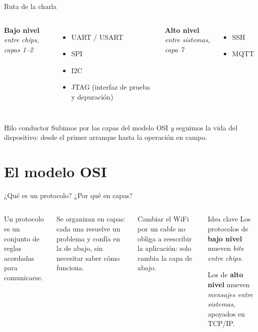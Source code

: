 \documentclass[aspectratio=169,11pt]{beamer}
\begin{document}
\begin{frame}{Ruta de la charla}
\begin{columns}[T]
\textbf{\color{cobre}Bajo nivel} \\ \emph{entre chips, capas 1--2}
\begin{itemize}
  \item UART / USART
  \item SPI
  \item I2C
  \item JTAG (interfaz de prueba y depuración)
\end{itemize}
\textbf{\color{acero}Alto nivel} \\ \emph{entre sistemas, capa 7}
\begin{itemize}
  \item SSH
  \item MQTT
\end{itemize}
\end{columns}

\vspace{1em}
\begin{alertblock}{Hilo conductor}
Subimos por las capas del modelo OSI \emph{y} seguimos la vida del dispositivo: desde el primer arranque hasta la operación en campo.
\end{alertblock}
\end{frame}

\section{El modelo OSI}

\begin{frame}{¿Qué es un protocolo? ¿Por qué en capas?}
\begin{columns}[T]
Un \alert{protocolo} es un conjunto de reglas acordadas para comunicarse.

\vspace{0.5em}
Se organizan en \alert{capas}: cada una resuelve un problema y confía en la de abajo, sin necesitar saber cómo funciona.

\vspace{0.5em}
{\footnotesize Cambiar el WiFi por un cable no obliga a reescribir la aplicación: solo cambia la capa de abajo.}

\begin{block}{Idea clave}
Los protocolos de \textbf{bajo nivel} mueven \emph{bits entre chips}.

Los de \textbf{alto nivel} mueven \emph{mensajes entre sistemas}, apoyados en TCP/IP.
\end{block}
\end{columns}
\end{frame}
\end{document}

